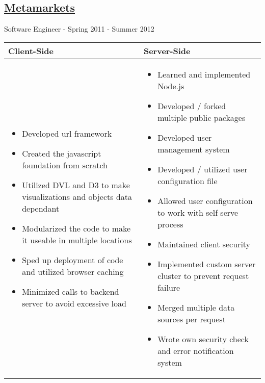 \documentclass[oneside]{article}
\begin{document}
  \subsection{\href{http://metamarkets.com/}{Metamarkets}}
  
    Software Engineer - Spring 2011 - Summer 2012
    
    \begin{tabular}{p{6.25cm} p{9.25cm}}
      {\bf Client-Side} & {\bf Server-Side} \\
      \hline
      \begin{itemize}
        \item Developed url framework
        \item Created the javascript foundation from scratch
        \item Utilized DVL and D3 to make visualizations and objects data dependant 
        \item Modularized the code to make it useable in multiple locations
        \item Sped up deployment of code and utilized browser caching
        \item Minimized calls to backend server to avoid excessive load
      \end{itemize} &
      \begin{itemize}
        \item Learned and implemented Node.js
        \item Developed / forked multiple public packages
        \item Developed user management system
        \item Developed / utilized user configuration file
        \item Allowed user configuration to work with self serve process
        \item Maintained client security
        \item Implemented custom server cluster to prevent request failure
        \item Merged multiple data sources per request
        \item Wrote own security check and error notification system
      \end{itemize}
    \end{tabular}
    
\end{document}
